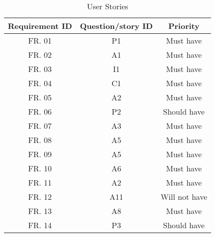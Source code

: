 \begin{table}[!htb]
  \centering
  \setlength{\aboverulesep}{0pt}
  \setlength{\belowrulesep}{0pt}
  \caption{User Stories}
  \label{tab:stories-requirements-relation}
  \footnotesize
  \begin{tabular}{c|c|c}
    \toprule
    \rowcolor[rgb]{0.753,0.753,0.753} \textbf{Requirement ID} & \textbf{Question/story ID} & \textbf{Priority} \\
    \hline
    \rowcolor[rgb]{0.898,0.898,0.898} FR. 01                  & P1                         & Must have         \\
    FR. 02                                                    & A1                         & Must have         \\
    \rowcolor[rgb]{0.898,0.898,0.898} FR. 03                  & I1                         & Must have         \\
    FR. 04                                                    & C1                         & Must have         \\
    \rowcolor[rgb]{0.898,0.898,0.898} FR. 05                  & A2                         & Must have         \\
    FR. 06                                                    & P2                         & Should have       \\
    \rowcolor[rgb]{0.898,0.898,0.898} FR. 07                  & A3                         & Must have         \\
    FR. 08                                                    & A5                         & Must have         \\
    \rowcolor[rgb]{0.898,0.898,0.898} FR. 09                  & A5                         & Must have         \\
    FR. 10                                                    & A6                         & Must have         \\
    \rowcolor[rgb]{0.898,0.898,0.898} FR. 11                  & A2                         & Must have         \\
    FR. 12                                                    & A11                        & Will not have     \\
    \rowcolor[rgb]{0.898,0.898,0.898} FR. 13                  & A8                         & Must have         \\
    FR. 14                                                    & P3                         & Should have       \\

\end{tabular}
\end{table}

